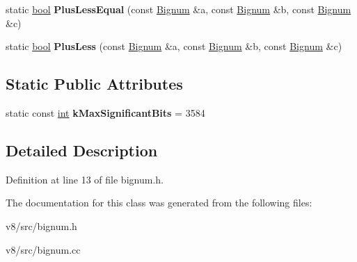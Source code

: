 \begin{DoxyCompactItemize}
\item 
\mbox{\label{classv8_1_1internal_1_1Bignum_a3c1bd429a2efc47c8ddf0b94db3718ff}} 
static \mbox{\hyperlink{classbool}{bool}} {\bfseries Plus\+Less\+Equal} (const \mbox{\hyperlink{classv8_1_1internal_1_1Bignum}{Bignum}} \&a, const \mbox{\hyperlink{classv8_1_1internal_1_1Bignum}{Bignum}} \&b, const \mbox{\hyperlink{classv8_1_1internal_1_1Bignum}{Bignum}} \&c)
\item 
\mbox{\label{classv8_1_1internal_1_1Bignum_afe71a5ec7c5f2cfdd617941b5a3942f6}} 
static \mbox{\hyperlink{classbool}{bool}} {\bfseries Plus\+Less} (const \mbox{\hyperlink{classv8_1_1internal_1_1Bignum}{Bignum}} \&a, const \mbox{\hyperlink{classv8_1_1internal_1_1Bignum}{Bignum}} \&b, const \mbox{\hyperlink{classv8_1_1internal_1_1Bignum}{Bignum}} \&c)
\end{DoxyCompactItemize}
\subsection*{Static Public Attributes}
\begin{DoxyCompactItemize}
\item 
\mbox{\label{classv8_1_1internal_1_1Bignum_a39b4483fcc51510126697c3111aae021}} 
static const \mbox{\hyperlink{classint}{int}} {\bfseries k\+Max\+Significant\+Bits} = 3584
\end{DoxyCompactItemize}


\subsection{Detailed Description}


Definition at line 13 of file bignum.\+h.



The documentation for this class was generated from the following files\+:\begin{DoxyCompactItemize}
\item 
v8/src/bignum.\+h\item 
v8/src/bignum.\+cc\end{DoxyCompactItemize}

